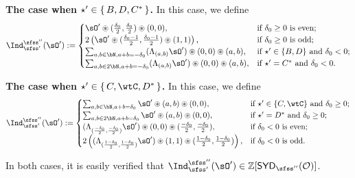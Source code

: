 \documentclass[11pt,a4paper]{amsart}
\def\SYD{{\mathsf{SYD}}}
\newcommand{\CO}{{\mathcal {O}}}
\newcommand{\Z}{\mathbb{Z}}
\numberwithin{equation}{section}
\theoremstyle{remark}
\def\SYD{{\mathsf{SYD}}}
\begin{document}
{\bf The case when  $\star' \in \set{B,D, C^{*}}$.}
In this case, we define 
\begin{equation}\label{eq:IndSYD1}
      \Ind_{\sfss'}^{\sfss''}(\sOp): =
      \begin{cases}
        \sOp\circledast (\frac{\delta_0}{2},\frac{\delta_0}{2})\circledast (0,0),
         & \text{if $\delta_0 \geq 0$ is even}; \\
        2  \left(\sOp\circledast (\frac{\delta_0-1}{2},\frac{\delta_0-1}{2})\circledast (1,1) \right),
         & \text{if $\delta_0\geq 0$ is odd};   \\
        \sum_{a,b\in \bN, a+b=-\delta_0}
        (\Lambda_{(a,b)}\sOp)\circledast(0,0)\circledast (a,b),
         & \text{if $\star'\in \{B,D\}$ and $\delta_0<0$};
         \\
         \sum_{a,b\in 2\bN, a+b=-\delta_0}
        (\Lambda_{(a,b)}\sOp)\circledast(0,0)\circledast (a,b),
         & \text{if $\star'=C^*$ and $\delta_0<0$}.
      \end{cases}
\end{equation}


{\bf The case when  $\star' \in \set{C,\wtC, D^{*}}$.}
In this case, we define 
\begin{equation}\label{eq:IndSYD2}
      \Ind_{\sfss'}^{\sfss''}(\sOp) :=
      \begin{cases}
        \sum_{a, b\in \bN, a+b=\delta_0}\sOp\circledast (a,b)\circledast (0,0),
           & \text{if $\star'\in \{C,\wtC\}$ and $\delta_0\geq 0$}; \\
            \sum_{a, b\in 2 \bN, a+b=\delta_0}\sOp\circledast (a,b)\circledast (0,0),
           & \text{if $\star'=D^*$ and $\delta_0\geq 0$}; \\
        (\Lambda_{(\frac{-\delta_0}{2},\frac{-\delta_0}{2})}\sOp) \circledast (0,0)
        \circledast (\frac{-\delta_0}{2},\frac{-\delta_0}{2}),
         & \text{if $\delta_0 < 0$ is even};  \\
        2\left((\Lambda_{(\frac{1-\delta_0}{2},\frac{1-\delta_0}{2})}\sOp)
        \circledast (1,1) \circledast (\frac{1-\delta_0}{2},\frac{1-\delta_0}{2})\right),
            & \text{if $\delta_0<0$ is odd}.             
      \end{cases}
\end{equation}
   
In both cases, it is easily verified that  $\Ind_{\sfss'}^{\sfss''}(\sOp)\in \Z[\SYD_{\sfss''}(\CO)]$.


\smallskip
\smallskip
\end{document}
